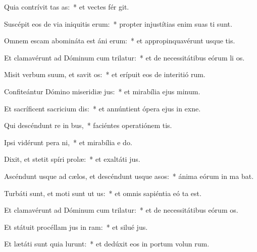 \item Quia contrívit tas as:~* et vectes fér git.
\item Suscépit eos de via iniquitis erum:~* propter injustítias enim suas ti sunt.
\item Omnem escam abomináta est áni erum:~* et appropinquavérunt usque   tis.
\item Et clamavérunt ad Dóminum cum trilatur:~* et de necessitátibus eórum li os.
\item Misit verbum suum, et savit os:~* et erípuit eos de interitió rum.
\item Confiteántur Dómino miseridiæ jus:~* et mirabília ejus  minum.
\item Et sacríficent sacricium dis:~* et annúntient ópera ejus in exne.
\item Qui descéndunt re in bus,~* faciéntes operatiónem   tis.
\item Ipsi vidérunt pera ni,~* et mirabília e  do.
\item Dixit, et stetit spíri prolæ:~* et exaltáti   jus.
\item Ascéndunt usque ad cælos, et descéndunt usque  asos:~* ánima eórum in ma bat.
\item Turbáti sunt, et moti sunt ut us:~* et omnis sapiéntia eó ta est.
\item Et clamavérunt ad Dóminum cum trilatur:~* et de necessitátibus eórum  os.
\item Et státuit procéllam jus in ram:~* et silué  jus.
\item Et lætáti sunt quia lurunt:~* et dedúxit eos in portum volun rum.
